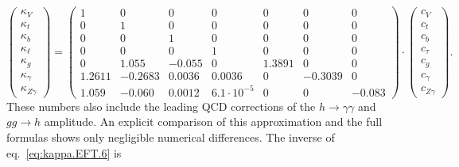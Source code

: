 \begin{equation}
  \label{eq:kappa.EFT.6}
  \begin{pmatrix}
    \kappa_{V}\\
    \kappa_{t}\\
    \kappa_{b}\\
    \kappa_{\ell}\\
    \kappa_{g}\\
    \kappa_{\gamma}\\
    \kappa_{Z\gamma}
  \end{pmatrix}
  = 
  \begin{pmatrix}
    1 & 0 & 0 & 0 & 0 & 0 & 0\\
    0 & 1 & 0 & 0 & 0 & 0 & 0\\
    0 & 0 & 1 & 0 & 0 & 0 & 0\\
    0 & 0 & 0 & 1 & 0 & 0 & 0\\
    0 & 1.055 & -0.055 & 0 & 1.3891 & 0 & 0\\
    1.2611 & -0.2683 & 0.0036 & 0.0036 & 0 & -0.3039 & 0\\
    1.059 & -0.060 & 0.0012 & 6.1 \cdot 10^{-5} & 0 & 0 & -0.083
  \end{pmatrix}
  \cdot
  \begin{pmatrix}
    c_{V}\\
    c_{t}\\
    c_{b}\\
    c_{\tau}\\
    c_{g}\\
    c_{\gamma}\\
    c_{Z\gamma}
  \end{pmatrix}.
\end{equation}
%
These numbers also include the leading QCD corrections of the $h\to \gamma\gamma$ and $gg\to h$ amplitude. An explicit comparison of this approximation and the full formulas shows only negligible numerical differences. The inverse of eq.~\eqref{eq:kappa.EFT.6} is
